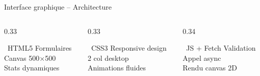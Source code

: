 \documentclass[aspectratio=169, 12pt]{beamer}
\begin{document}
\begin{frame}{Interface graphique -- Architecture}
\vspace{0.4cm}
\begin{columns}[T]
\begin{column}{0.33\textwidth}
\begin{block}{\tiny \faFileAlt~HTML5}
Formulaires\\
Canvas 500×500\\
Stats dynamiques
\end{block}
\end{column}
\begin{column}{0.33\textwidth}
\begin{block}{\tiny \faPalette~CSS3}
Responsive design\\
2 col desktop\\
Animations fluides
\end{block}
\end{column}
\begin{column}{0.34\textwidth}
\begin{block}{\tiny \faCode~JS + Fetch}
Validation\\
Appel async\\
Rendu canvas 2D
\end{block}
\end{column}
\end{columns}
\end{frame}
\end{document}
